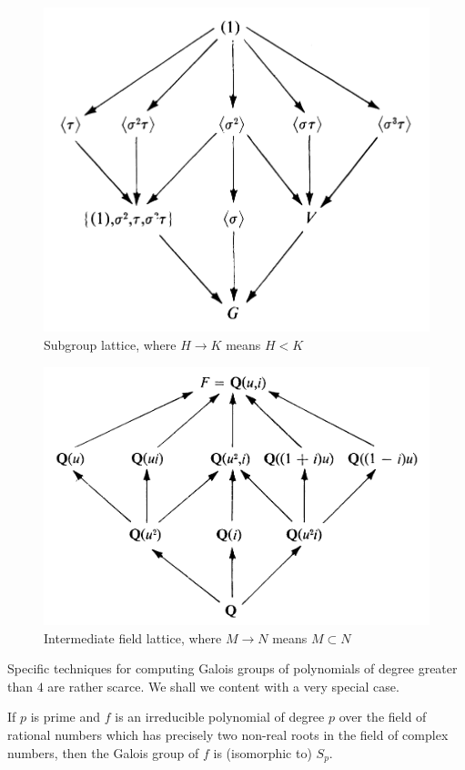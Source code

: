 \begin{example}
\begin{figure}[htbp]
    \includegraphics[scale=0.29]{Images/Subgroups.png}
    \caption{Subgroup lattice, where $H\to K$ means $H<K$}
\end{figure}
\begin{figure}[htbp]
    \center
    \includegraphics[scale=0.29]{Images/Intermediate Fields.png}
    \caption{Intermediate field lattice, where $M\to N$ means $M\subset N$}
\end{figure}
\end{example}
Specific techniques for computing Galois groups of polynomials of degree greater than $4$ are rather scarce. We shall we content with a very special case.
\begin{theorem}
If $p$ is prime and $f$ is an irreducible polynomial of degree $p$ over the field of rational numbers which has precisely two non-real roots in the field of complex numbers, then the Galois group of $f$ is (isomorphic to) $S_p$.
\end{theorem}
